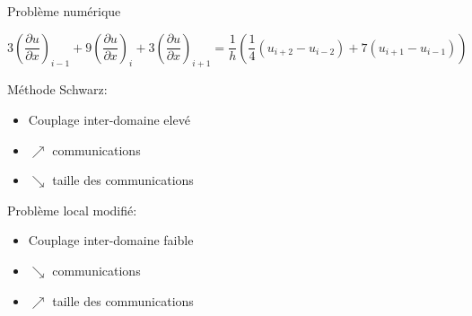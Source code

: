 \documentclass{beamer}
\begin{document}
\begin{frame}
  Problème numérique

\footnotesize
$$3\left( \frac{\partial u}{\partial x}\right) _{i-1} + 9\left( \frac{\partial u}{\partial x}\right) _{i} + 3\left( \frac{\partial u}{\partial x}\right) _{i+1} = \frac{1}{h}\left(  \frac{1}{4} \left( u_{i+2}-u_{i-2} \right) + 7 \left( u_{i+1} - u_{i-1} \right) \right) $$

\end{frame}


\begin{frame}
  Méthode Schwarz:
  \begin{itemize}
  \item Couplage inter-domaine elevé
  \item $\nearrow$ communications
  \item $\searrow$ taille des communications
  \end{itemize}
  Problème local modifié:
  \begin{itemize}
  \item Couplage inter-domaine faible
  \item $\searrow$ communications
  \item $\nearrow$ taille des communications
  \end{itemize}
\end{frame}
\end{document}
